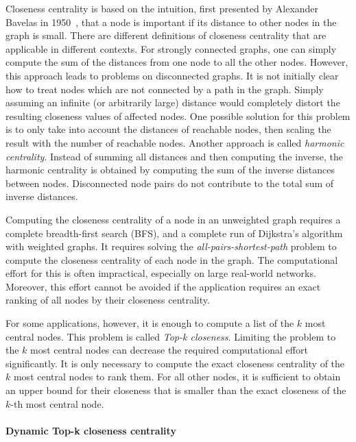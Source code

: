 Closeness centrality is based on the intuition, first presented by Alexander Bavelas in 1950~\cite{bavelas1950communication}, that a node is important if its distance to other nodes in the graph is small. There are different definitions of closeness centrality that are applicable in different contexts. For strongly connected graphs, one can simply compute the sum of the distances from one node to all the other nodes. However, this approach leads to problems on disconnected graphs. It is not initially clear how to treat nodes which are not connected by a path in the graph. Simply assuming an infinite (or arbitrarily large) distance would completely distort the resulting closeness values of affected nodes. One possible solution for this problem is to only take into account the distances of reachable nodes, then scaling the result with the number of reachable nodes. Another approach is called \emph{harmonic centrality}. Instead of summing all distances and then computing the inverse, the harmonic centrality is obtained by computing the sum of the inverse distances between nodes. Disconnected node pairs do not contribute to the total sum of inverse distances.

Computing the closeness centrality of a node in an unweighted graph requires a complete breadth-first search (BFS), and a complete run of Dijkstra's algorithm~\cite{dijkstra1959note} with weighted graphs. It requires solving the \emph{all-pairs-shortest-path} problem to compute the closeness centrality of each node in the graph. The computational effort for this is often impractical, especially on large real-world networks. Moreover, this effort cannot be avoided if the application requires an exact ranking of all nodes by their closeness centrality.  

For some applications, however, it is enough to compute a list of the $k$ most central nodes. This problem is called \emph{Top-k closeness}. Limiting the problem to the $k$ most central nodes can decrease the required computational effort significantly. It is only necessary to compute the exact closeness centrality of the $k$ most central nodes to rank them. For all other nodes, it is sufficient to obtain an upper bound for their closeness that is smaller than the exact closeness of the $k$-th most central node.


\paragraph{Dynamic Top-k closeness centrality}

